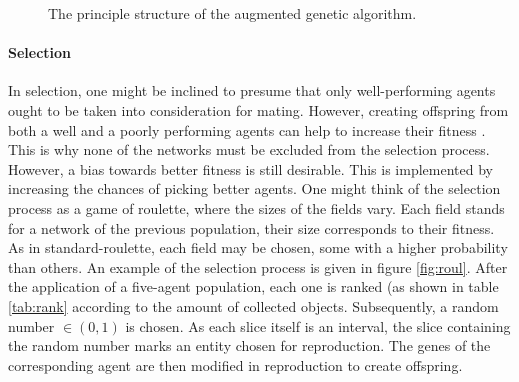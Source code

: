 \documentclass[10pt,a4paper,DIV=11]{scrreprt}
\begin{document}
\begin{figure}[H]
    \centering
\caption{The principle structure of the augmented genetic algorithm.\cite{CROSSOVER}}
\label{fig:ag}
\end{figure}

\paragraph{Selection}
In selection, one might be inclined to presume that only well-performing agents ought to be taken into consideration for mating. However, creating
offspring from both a well and a poorly performing agents can help to increase their fitness \cite{KIKLAR}. This is why none
of the networks must be excluded from the selection process. However, a bias towards better fitness is still desirable. This is implemented by 
increasing the chances of picking better agents. One might think of the selection process as a game of roulette, where the sizes of the
fields vary. Each field stands for a network of the previous population, their size corresponds to their fitness. As in standard-roulette, each
field may be chosen, some with a higher probability than others. An example of the selection process is given in figure \ref{fig:roul}. After the 
application of a five-agent population, each one is ranked (as shown in table \ref{tab:rank} according to the amount of collected objects. 
Subsequently, a random number $\in (0,1)$ is chosen. As each slice itself is an interval, the slice containing the random number marks an entity 
chosen for reproduction. The genes of the corresponding agent are then modified in reproduction to create offspring.
  
\end{document}
